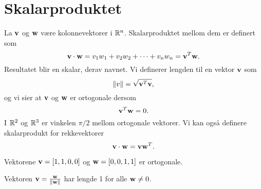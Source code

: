 

\label{ch:projeksjon}
\section*{Skalarproduktet}
La $\mathbf{v}$ og $\mathbf{w}$ være kolonnevektorer i $\mathbb{R}^n$. Skalarproduktet mellom dem er definert som
\[
 \mathbf{v}\cdot  \mathbf{w} = v_1w_1 + v_2w_2 + \cdots +v_nw_n=\mathbf{v}^T\mathbf{w}.
 \] 
 Resultatet blir en skalar, derav navnet. Vi definerer lengden til en vektor $\mathbf{v}$ som 
 \[
 \|v\|=\sqrt{\mathbf{v}^T\mathbf{v}},
 \]
 og vi sier at $\mathbf{v}$ og $\mathbf{w}$ er ortogonale dersom 
\[
 \mathbf{v}^T  \mathbf{w} = 0.
 \]
I $\mathbb{R}^2$ og $\mathbb{R}^3$ er vinkelen $\pi/2$ mellom ortogonale vektorer. Vi kan også definere skalarprodukt for rekkevektorer
 \[
 \mathbf{v}\cdot  \mathbf{w} =\mathbf{v}\mathbf{w}^T.
 \] 
 \begin{ex}
 Vektorene $\mathbf{v}=[1,1,0,0]$ og $\mathbf{w}=[0,0,1,1]$ er ortogonale. 
 \end{ex}

 \begin{ex}
 Vektoren $\mathbf{v}=\frac{\mathbf{w}}{\|\mathbf{w}\|}$ har lengde 1 for alle $\mathbf{w} \neq 0$.
 \end{ex}
 

